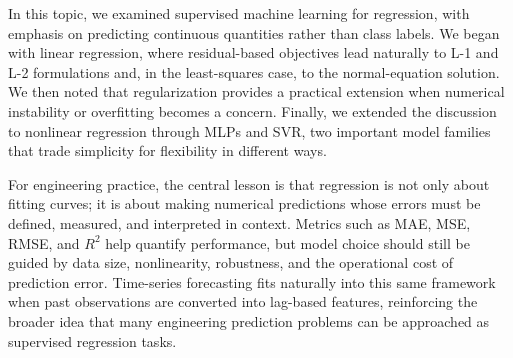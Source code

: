 \documentclass[12pt]{article}
\begin{document}
In this topic, we examined supervised machine learning for regression, with emphasis on predicting continuous quantities rather than class labels. We began with linear regression, where residual-based objectives lead naturally to L-1 and L-2 formulations and, in the least-squares case, to the normal-equation solution. We then noted that regularization provides a practical extension when numerical instability or overfitting becomes a concern. Finally, we extended the discussion to nonlinear regression through MLPs and SVR, two important model families that trade simplicity for flexibility in different ways.

For engineering practice, the central lesson is that regression is not only about fitting curves; it is about making numerical predictions whose errors must be defined, measured, and interpreted in context. Metrics such as MAE, MSE, RMSE, and $R^2$ help quantify performance, but model choice should still be guided by data size, nonlinearity, robustness, and the operational cost of prediction error. Time-series forecasting fits naturally into this same framework when past observations are converted into lag-based features, reinforcing the broader idea that many engineering prediction problems can be approached as supervised regression tasks.
\end{document}
